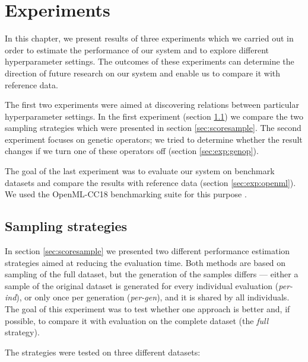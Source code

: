 \chapter{Experiments} \label{experiments}
In this chapter, we present results of three experiments which we carried out
in order to estimate the performance of our system and to explore different
hyperparameter settings. The outcomes of these experiments can determine the
direction of future research on our system and enable us to compare
it with reference data.

The first two experiments were aimed at discovering relations between
particular hyperparameter settings. In the first experiment
(section \ref{sec:exp:sample}) we compare the two
sampling strategies which were presented in section \ref{sec:scoresample}.
The second experiment focuses on genetic operators; we tried to determine
whether the result changes if we turn one of these operators off
(section \ref{sec:exp:genop}). 

The goal of the last experiment was to evaluate our system on benchmark
datasets and compare the results with reference data
(section \ref{sec:exp:openml}). We used the OpenML-CC18 benchmarking suite for
this purpose \citep{openmlcc18}.

\section{Sampling strategies} \label{sec:exp:sample}
In section \ref{sec:scoresample} we presented two different performance
estimation strategies aimed at reducing the evaluation time. Both methods
are based on sampling of the full dataset, but the generation of the samples
differs --- either a sample of the original dataset is generated for every
individual evaluation (\emph{per-ind}), or only once per generation
(\emph{per-gen}), and it is shared by all individuals. The goal of this experiment
was to test whether one approach is better and, if possible, to compare it with
evaluation on the complete dataset (the \emph{full} strategy).

The strategies were tested on three different datasets:

